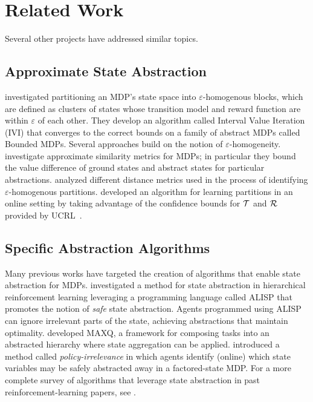 \section{Related Work}

Several other projects have addressed similar topics.

\subsection{Approximate State Abstraction}
\citet{dean1997model} investigated partitioning an \ac{MDP}'s state space into $\varepsilon$-homogenous blocks, which are defined as clusters of states whose transition model and reward function are within $\varepsilon$ of each other. They develop an algorithm called Interval Value Iteration (IVI) that converges to the correct bounds on a family of abstract MDPs called Bounded \acp{MDP}. Several approaches build on the notion of $\varepsilon$-homogeneity. \citet{ferns2004metrics,ferns2006methods} investigate approximate similarity metrics for \acp{MDP}; in particular they bound the value difference of ground states and abstract states for particular abstractions. \citet{even2003approximate} analyzed different distance metrics used in the process of identifying $\varepsilon$-homogenous partitions. \citet{ortner2013adaptive} developed an algorithm for learning partitions in an online setting by taking advantage of the confidence bounds for $\mathcal{T}$ and $\mathcal{R}$ provided by UCRL~\cite{auer2009near}.

\subsection{Specific Abstraction Algorithms}
Many previous works have targeted the creation of algorithms that enable state abstraction for MDPs. \citet{andre2002state} investigated a method for state abstraction in hierarchical reinforcement learning leveraging a programming language called ALISP that promotes the notion of {\it safe} state abstraction. Agents programmed using ALISP can ignore irrelevant parts of the state, achieving abstractions that maintain optimality. \citet{dietterich2000hierarchical} developed MAXQ, a framework for composing tasks into an abstracted hierarchy where state aggregation can be applied. \citet{jong2005state} introduced a method called {\it policy-irrelevance} in which agents identify (online) which state variables may be safely abstracted away in a factored-state \ac{MDP}. For a more complete survey of algorithms that leverage state abstraction in past reinforcement-learning papers, see \citet{li2006towards}.

